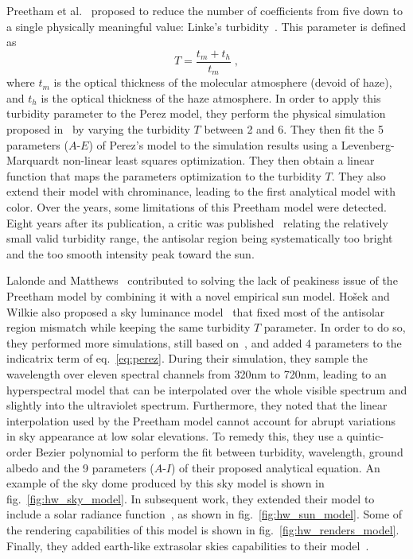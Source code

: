 Preetham et al.~\cite{preetham-siggraph-99} proposed to reduce the number of coefficients from five down to a single physically meaningful value: Linke's turbidity~\cite{mccartney1976optics}. This parameter is defined as
\begin{equation}
T = \frac{t_m + t_h}{t_m} \;,
\end{equation}
where $t_m$ is the optical thickness of the molecular atmosphere (devoid of haze), and $t_h$ is the optical thickness of the haze atmosphere. In order to apply this turbidity parameter to the Perez model, they perform the physical simulation proposed in~\cite{nishita1996display} by varying the turbidity $T$ between 2 and 6. They then fit the 5 parameters ($A$-$E$) of Perez's model to the simulation results using a Levenberg-Marquardt non-linear least squares optimization. They then obtain a linear function that maps the parameters optimization to the turbidity $T$. They also extend their model with chrominance, leading to the first analytical model with color. 
Over the years, some limitations of this Preetham model were detected. Eight years after its publication, a critic was published~\cite{zotti2007critical} relating the relatively small valid turbidity range, the antisolar region being systematically too bright and the too smooth intensity peak toward the sun.

Lalonde and Matthews~\cite{lalonde-3dv-14} contributed to solving the lack of peakiness issue of the Preetham model by combining it with a novel empirical sun model. Ho\v{s}ek and Wilkie also proposed a sky luminance model~\cite{hosek-siggraph-12} that fixed most of the antisolar region mismatch while keeping the same turbidity $T$ parameter. In order to do so, they performed more simulations, still based on~\cite{nishita1996display}, and added 4 parameters to the indicatrix term of eq.~\eqref{eq:perez}. During their simulation, they sample the wavelength over eleven spectral channels from 320nm to 720nm, leading to an hyperspectral model that can be interpolated over the whole visible spectrum and slightly into the ultraviolet spectrum. Furthermore, they noted that the linear interpolation used by the Preetham model cannot account for abrupt variations in sky appearance at low solar elevations. To remedy this, they use a quintic-order Bezier polynomial to perform the fit between turbidity, wavelength, ground albedo and the 9 parameters ($A$-$I$) of their proposed analytical equation. An example of the sky dome produced by this sky model is shown in fig.~\ref{fig:hw_sky_model}. In subsequent work, they extended their model to include a solar radiance function~\cite{hosek-cga-13}, as shown in fig.~\ref{fig:hw_sun_model}. Some of the rendering capabilities of this model is shown in fig.~\ref{fig:hw_renders_model}. Finally, they added earth-like extrasolar skies capabilities to their model~\cite{wilkie2013predicting}.




